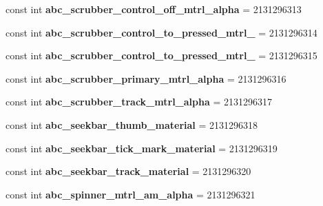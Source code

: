 \begin{DoxyCompactItemize}
const int {\bfseries abc\+\_\+scrubber\+\_\+control\+\_\+off\+\_\+mtrl\+\_\+alpha} = 2131296313
\item 
\mbox{\label{classst_delivery_1_1_resource_1_1_drawable_a80ca43e29a1574105df0e711ad0c0f36}} 
const int {\bfseries abc\+\_\+scrubber\+\_\+control\+\_\+to\+\_\+pressed\+\_\+mtrl\+\_} = 2131296314
\item 
\mbox{\label{classst_delivery_1_1_resource_1_1_drawable_af5ffdf6dc12c8ec7be91861db4d70817}} 
const int {\bfseries abc\+\_\+scrubber\+\_\+control\+\_\+to\+\_\+pressed\+\_\+mtrl\+\_} = 2131296315
\item 
\mbox{\label{classst_delivery_1_1_resource_1_1_drawable_af50928cacefb411a44c4aaa3e198bc3b}} 
const int {\bfseries abc\+\_\+scrubber\+\_\+primary\+\_\+mtrl\+\_\+alpha} = 2131296316
\item 
\mbox{\label{classst_delivery_1_1_resource_1_1_drawable_abc9fa66f3d9abfe25e9c4b3868d07d4d}} 
const int {\bfseries abc\+\_\+scrubber\+\_\+track\+\_\+mtrl\+\_\+alpha} = 2131296317
\item 
\mbox{\label{classst_delivery_1_1_resource_1_1_drawable_abdee33bbceabf47c9f722119f9b1acba}} 
const int {\bfseries abc\+\_\+seekbar\+\_\+thumb\+\_\+material} = 2131296318
\item 
\mbox{\label{classst_delivery_1_1_resource_1_1_drawable_a346c4f535fd50e568398cad58cf3e872}} 
const int {\bfseries abc\+\_\+seekbar\+\_\+tick\+\_\+mark\+\_\+material} = 2131296319
\item 
\mbox{\label{classst_delivery_1_1_resource_1_1_drawable_a520f339cd33222e1364dcf448d69c241}} 
const int {\bfseries abc\+\_\+seekbar\+\_\+track\+\_\+material} = 2131296320
\item 
\mbox{\label{classst_delivery_1_1_resource_1_1_drawable_a032029c92fc4fac1b16aa2afa7c1f532}} 
const int {\bfseries abc\+\_\+spinner\+\_\+mtrl\+\_\+am\+\_\+alpha} = 2131296321

\end{DoxyCompactItemize}
